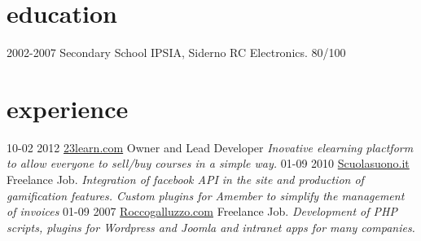 \documentclass[print]{cv}
\begin{document}
\section{education}

\begin{entrylist}

  \entry
    {2002-2007}
    {Secondary School}
    {IPSIA, Siderno RC}
    {Electronics. 80/100}

\end{entrylist}

\section{experience}

\begin{entrylist}
  \entry
    {10-02 2012}
     {\href{http://www.23learn.com}{23learn.com}}
    {Owner and Lead Developer}
    {\emph{Inovative elearning plactform to allow everyone to sell/buy courses in a simple way. }}
  \entry
    {01-09 2010}
    {\href{http://www.scuolasuono.it}{Scuolasuono.it}}
    {Freelance Job.}
    {\emph{Integration of facebook API in the site and production of gamification features. Custom plugins for Amember to simplify the management of invoices}}
  \entry
    {01-09 2007}
    {\href{http://roccogalluzzo.com}{Roccogalluzzo.com}}
    {Freelance Job.}
    {\emph{Development of PHP scripts, plugins for Wordpress and Joomla and intranet apps for many companies.}}
\end{entrylist}
\end{document}
